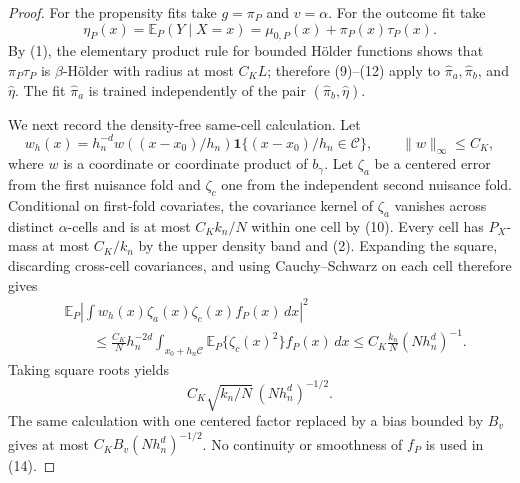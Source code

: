 \documentclass{article}
\begin{document}
\begin{proof}
For the propensity fits take \(g=\pi_P\) and \(v=\alpha\).  For the outcome fit take
\[
\eta_P(x)=\mathbb E_P(Y\mid X=x)
=\mu_{0,P}(x)+\pi_P(x)\tau_P(x).
\tag{13}
\]
By (1), the elementary product rule for bounded H\"older functions shows that \(\pi_P\tau_P\) is \(\beta\)-H\"older with radius at most \(C_KL\); therefore (9)--(12) apply to \(\widehat\pi_a,\widehat\pi_b\), and \(\widehat\eta\).  The fit \(\widehat\pi_a\) is trained independently of the pair \((\widehat\pi_b,\widehat\eta)\).

We next record the density-free same-cell calculation.  Let
\[
w_h(x)=h_n^{-d}w((x-x_0)/h_n)
\mathbf 1\{(x-x_0)/h_n\in\mathcal C\},
\qquad \lVert w\rVert_\infty\le C_K,
\]
where \(w\) is a coordinate or coordinate product of \(b_\gamma\).  Let \(\zeta_a\) be a centered error from the first nuisance fold and \(\zeta_c\) one from the independent second nuisance fold.  Conditional on first-fold covariates, the covariance kernel of \(\zeta_a\) vanishes across distinct \(\alpha\)-cells and is at most \(C_Kk_n/N\) within one cell by (10).  Every cell has \(P_X\)-mass at most \(C_K/k_n\) by the upper density band and (2).  Expanding the square, discarding cross-cell covariances, and using Cauchy--Schwarz on each cell therefore gives
\[
\begin{aligned}
&\mathbb E_P\left|
\int w_h(x)\zeta_a(x)\zeta_c(x)f_P(x)\,dx
\right|^2\\
&\qquad\le
\frac{C_K}{N}h_n^{-2d}
\int_{x_0+h_n\mathcal C}
\mathbb E_P\{\zeta_c(x)^2\}f_P(x)\,dx
\le C_K\frac{k_n}{N}(Nh_n^d)^{-1}.
\end{aligned}
\tag{14}
\]
Taking square roots yields
\[
C_K\sqrt{k_n/N}\,(Nh_n^d)^{-1/2}.
\tag{15}
\]
The same calculation with one centered factor replaced by a bias bounded by \(B_v\) gives at most \(C_KB_v(Nh_n^d)^{-1/2}\).  No continuity or smoothness of \(f_P\) is used in (14).


\end{proof}
\end{document}
